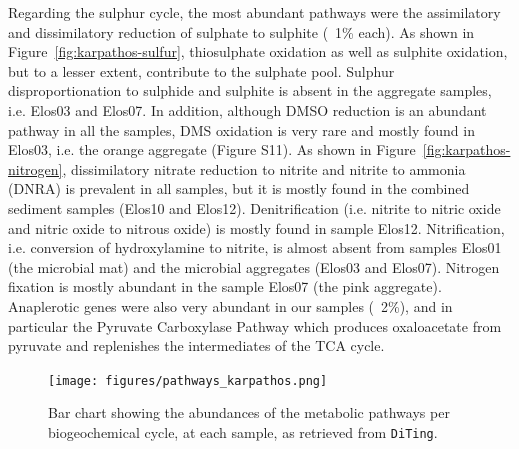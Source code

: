    Regarding the sulphur cycle, the most abundant pathways were the assimilatory and dissimilatory reduction of sulphate to sulphite (~1\% each). 
   As shown in Figure~\ref{fig:karpathos-sulfur}, thiosulphate oxidation as well as sulphite oxidation, but to a lesser extent, contribute to the sulphate pool. 
   Sulphur disproportionation to sulphide and sulphite is absent in the aggregate samples, i.e. Elos03 and Elos07. In addition, although DMSO reduction is 
   an abundant pathway in all the samples, DMS oxidation is very rare and mostly found in Elos03, i.e. the orange aggregate (Figure S11).
   As shown in Figure~\ref{fig:karpathos-nitrogen}, dissimilatory nitrate reduction to nitrite and nitrite to ammonia (DNRA) is prevalent in all samples, 
   but it is mostly found in the combined sediment samples (Elos10 and Elos12). 
   Denitrification (i.e. nitrite to nitric oxide and nitric oxide to nitrous oxide) is mostly found in sample Elos12. Nitrification, i.e. conversion of 
   hydroxylamine to nitrite, is almost absent from samples Elos01 (the microbial mat) and the microbial aggregates (Elos03 and Elos07). 
   Nitrogen fixation is mostly abundant in the sample Elos07 (the pink aggregate). 
   Anaplerotic genes were also very abundant in our samples (~2\%), and in particular the Pyruvate Carboxylase Pathway which produces oxaloacetate from pyruvate and replenishes the intermediates of the TCA cycle. 


   \begin{figure}[!htbp]
      \centering
      \texttt{[image: figures/pathways\_karpathos.png]}
      \caption[Abundances of the metabolic pathways per biogeochemical cycle, at each sample]{
         Bar chart showing the abundances of the metabolic pathways per biogeochemical cycle, at each sample, as retrieved from \texttt{DiTing}. 
      }
      \label{fig:pathway-abundances}
   \end{figure}   



